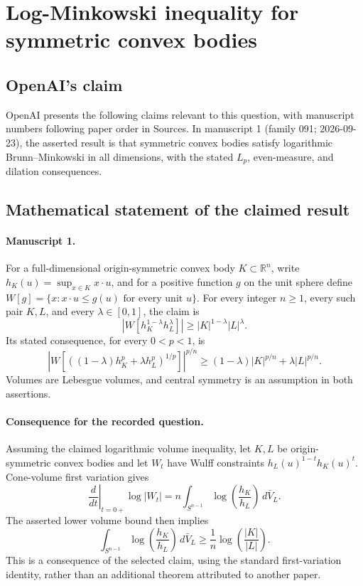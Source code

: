 \documentclass[11pt]{article}
\begin{document}
\section*{Log-Minkowski inequality for symmetric convex bodies}

\subsection{OpenAI's claim}
OpenAI presents the following claims relevant to this question, with manuscript numbers following paper order in Sources. In manuscript 1 (family 091; 2026-09-23), the asserted result is that symmetric convex bodies satisfy logarithmic Brunn--Minkowski in all dimensions, with the stated $L_p$, even-measure, and dilation consequences.

\subsection{Mathematical statement of the claimed result}
\paragraph{Manuscript 1.}
For a full-dimensional origin-symmetric convex body $K\subset\mathbb R^n$, write $h_K(u)=\sup_{x\in K}x\cdot u$, and for a positive function $g$ on the unit sphere define $W[g]=\{x:x\cdot u\le g(u)\text{ for every unit }u\}$. For every integer $n\ge1$, every such pair $K,L$, and every $\lambda\in[0,1]$, the claim is
\[
 |W[h_K^{1-\lambda}h_L^{\lambda}]|\ge |K|^{1-\lambda}|L|^{\lambda}.
\]
Its stated consequence, for every $0<p<1$, is
\[
 \left|W[((1-\lambda)h_K^p+\lambda h_L^p)^{1/p}]\right|^{p/n}
 \ge(1-\lambda)|K|^{p/n}+\lambda|L|^{p/n}.
\]
Volumes are Lebesgue volumes, and central symmetry is an assumption in both assertions.

\paragraph{Consequence for the recorded question.}
Assuming the claimed logarithmic volume inequality, let $K,L$ be origin-symmetric convex bodies and let $W_t$ have Wulff constraints $h_L(u)^{1-t}h_K(u)^t$. Cone-volume first variation gives
\[
 \left.\frac{d}{dt}\right|_{t=0+}\log |W_t|
 =n\int_{S^{n-1}}\log\!\left(\frac{h_K}{h_L}\right)\,d\bar V_L.
\]
The asserted lower volume bound then implies
\[
 \int_{S^{n-1}}\log\!\left(\frac{h_K}{h_L}\right)\,d\bar V_L
 \ge\frac1n\log\!\left(\frac{|K|}{|L|}\right).
\]
This is a consequence of the selected claim, using the standard first-variation identity, rather than an additional theorem attributed to another paper.
\end{document}
